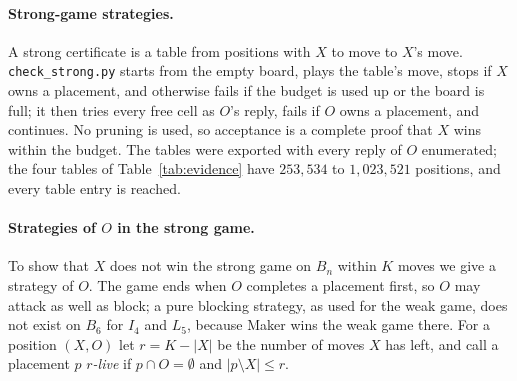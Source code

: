 \documentclass[11pt]{article}
\theoremstyle{definition}
\theoremstyle{remark}
\newcommand{\file}[1]{\texttt{#1}}
\begin{document}
\paragraph{Strong-game strategies.} A strong certificate is a table from positions with $X$ to move
to $X$'s move. \file{check\_strong.py} starts from the empty board, plays the table's move, stops if
$X$ owns a placement, and otherwise fails if the budget is used up or the board is full; it then
tries every free cell as $O$'s reply, fails if $O$ owns a placement, and continues. No pruning is
used, so acceptance is a complete proof that $X$ wins within the budget. The tables were exported
with every reply of $O$ enumerated; the four tables of Table~\ref{tab:evidence} have
$253{,}534$ to $1{,}023{,}521$ positions, and every table entry is reached.

\paragraph{Strategies of $O$ in the strong game.} To show that $X$ does not win the strong game on
$B_n$ within $K$ moves we give a strategy of $O$. The game ends when $O$ completes a placement first,
so $O$ may attack as well as block; a pure blocking strategy, as used for the weak game, does not
exist on $B_6$ for $I_4$ and $L_5$, because Maker wins the weak game there. For a position $(X,O)$
let $r=K-|X|$ be the number of moves $X$ has left, and call a placement $p$ \emph{$r$-live} if
$p\cap O=\emptyset$ and $|p\setminus X|\le r$.
\end{document}
